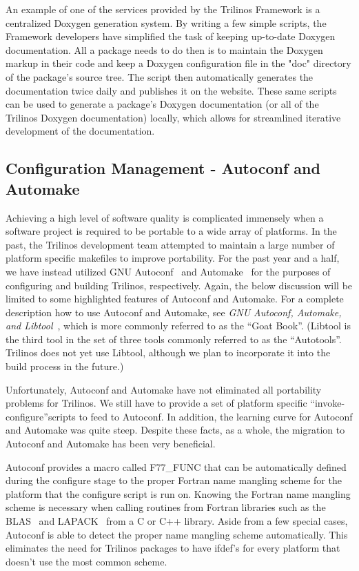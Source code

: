 \documentclass[12pt,relax]{article}
\begin{document}
An example of one of the services provided by the Trilinos Framework is a
centralized Doxygen generation system.  By writing a few simple scripts, 
the Framework developers have simplified the task of keeping up-to-date
Doxygen documentation.  All a package needs to do then is to maintain the 
Doxygen markup in their code and keep a Doxygen configuration file in the
"doc" directory of the package's source tree.  The script then automatically
generates the documentation twice daily and publishes it on the website.  These
same scripts can be used to generate a package's Doxygen documentation (or all
of the Trilinos Doxygen documentation) locally, which allows for streamlined
iterative development of the documentation.

\subsection{Configuration Management - Autoconf and Automake}

Achieving a high level of software quality is complicated immensely when 
a software project is required to be portable to a wide array of platforms.
In the past, the Trilinos development team attempted to maintain a large 
number of platform specific makefiles to improve portability.  For the past 
year and a half, we have instead utilized GNU Autoconf~\cite{Autoconf} and 
Automake~\cite{Automake} for 
the purposes of configuring and building Trilinos, respectively.  Again, 
the below discussion will be limited to some highlighted features of Autoconf 
and Automake.  
For a complete description how to use Autoconf and Automake, see 
{\it GNU Autoconf, Automake, and Libtool}~\cite{GoatBook}, which is 
more commonly referred to as the ``Goat Book''.  (Libtool is the third tool 
in the set of three tools commonly referred to as the ``Autotools''.  Trilinos 
does not yet use Libtool, although we plan to incorporate it into the build 
process in the future.)

Unfortunately, Autoconf and Automake have not eliminated all portability 
problems for Trilinos.  We still have to provide a set of platform specific
``invoke-configure''scripts to feed to Autoconf.  In addition, the learning 
curve for Autoconf and Automake was quite steep.  Despite these facts, 
as a whole, the migration to Autoconf and Automake has been very 
beneficial.  

Autoconf provides a macro called F77\_FUNC that can be 
automatically defined during the configure stage to the proper Fortran
name mangling scheme for the platform that the configure script is run on.  
Knowing the Fortran name mangling scheme is necessary when calling routines 
from Fortran libraries such as the BLAS~\cite{BLAS1,BLAS2,BLAS3} and 
LAPACK~\cite{lapack} from a C or C++ library.  Aside from a few special cases, 
Autoconf is able to detect the proper name mangling scheme automatically.  
This eliminates the need for Trilinos packages to have ifdef's for every 
platform that doesn't use the most common scheme.
\end{document}
